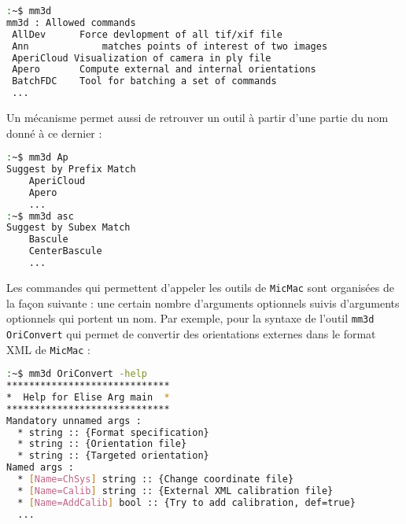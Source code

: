 \begin{lstlisting}[language=bash]
:~$ mm3d
mm3d : Allowed commands 
 AllDev		 Force devlopment of all tif/xif file
 Ann	 		 matches points of interest of two images
 AperiCloud	Visualization of camera in ply file
 Apero	 	 Compute external and internal orientations
 BatchFDC	 Tool for batching a set of commands
 ...
\end{lstlisting}

Un mécanisme permet aussi de retrouver un outil à partir d'une partie du nom donné à ce dernier :

\begin{lstlisting}[language=bash]
:~$ mm3d Ap
Suggest by Prefix Match
    AperiCloud
    Apero
    ...
:~$ mm3d asc
Suggest by Subex Match
    Bascule
    CenterBascule
    ...
\end{lstlisting}

Les commandes qui permettent d'appeler les outils de {\tt MicMac} sont organisées de la façon suivante : une certain nombre d'arguments optionnels suivis d'arguments optionnels qui portent un nom. Par exemple, pour la syntaxe de l'outil {\tt mm3d OriConvert} qui permet de convertir des orientations externes dans le format XML de {\tt MicMac} :
\begin{lstlisting}[language=bash]
:~$ mm3d OriConvert -help
*****************************
*  Help for Elise Arg main  *
*****************************
Mandatory unnamed args : 
  * string :: {Format specification}
  * string :: {Orientation file}
  * string :: {Targeted orientation}
Named args : 
  * [Name=ChSys] string :: {Change coordinate file}
  * [Name=Calib] string :: {External XML calibration file}
  * [Name=AddCalib] bool :: {Try to add calibration, def=true}
  ...
\end{lstlisting}

